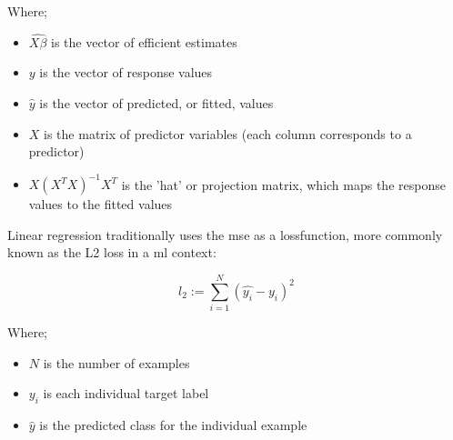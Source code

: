 Where;

\begin{itemize}
    \item $\hat{X\beta}$ is the vector of efficient estimates
    \item $y$ is the vector of response values  
    \item $\hat{y}$ is the vector of predicted, or fitted, values  
    \item $X$ is the matrix of predictor variables (each column corresponds to a predictor)
    \item $X(X^TX)^{-1}X^T$ is the 'hat' or projection matrix, which maps the response values to the fitted values
\end{itemize}

Linear regression traditionally uses the  \gls{mse} as a \gls{lossfunction}, more commonly known as the L2 loss in a \gls{ml} context:

\begin{equation}
l_2 := \sum_{i = 1}^N (\hat{y_i} - y_i)^2
\end{equation}

Where;

\begin{itemize}
    \item $N$ is the number of examples  
    \item $y_i$ is each individual target label  
    \item $\hat{y}$ is the predicted class for the individual example 
\end{itemize}

